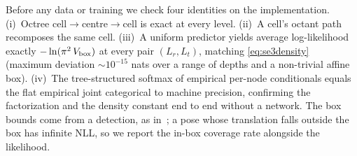 Before any data or training we check four identities on the implementation.
(i)~Octree cell$\to$centre$\to$cell is exact at every level.
(ii)~A cell's octant path recomposes the same cell.
(iii)~A uniform predictor yields average log-likelihood exactly
$-\ln(\pi^2\,V_{\text{box}})$ at every pair $(L_r,L_t)$, matching
\cref{eq:se3density} (maximum deviation $\sim\!10^{-15}$ nats over a range of
depths and a non-trivial affine box).
(iv)~The tree-structured softmax of empirical per-node conditionals equals the flat
empirical joint categorical to machine precision, confirming the factorization and
the density constant end to end without a network.
The box bounds come from a detection, as in~\cite{haugaard2023spyropose}; a pose
whose translation falls outside the box has infinite NLL, so we report the in-box
coverage rate alongside the likelihood.
